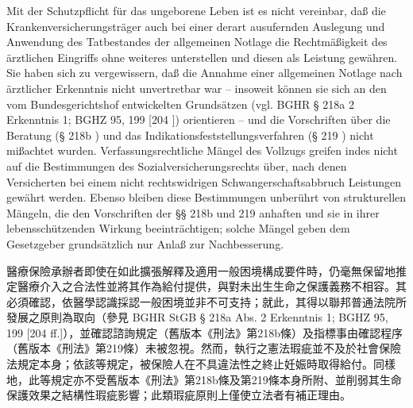 \documentclass[12pt]{article}
\begin{document}
\begin{sourcepara}[title={原文E.232}]
Mit der Schutzpflicht für das ungeborene Leben ist es nicht vereinbar, daß die Krankenversicherungsträger auch bei einer derart ausufernden Auslegung und Anwendung des Tatbestandes der allgemeinen Notlage die Rechtmäßigkeit des ärztlichen Eingriffs ohne weiteres unterstellen und diesen als Leistung gewähren. Sie haben sich zu vergewissern, daß die Annahme einer allgemeinen Notlage nach ärztlicher Erkenntnis nicht unvertretbar war -- insoweit können sie sich an den vom Bundesgerichtshof entwickelten Grundsätzen (vgl. BGHR \abbrStGB{} § 218a \abbrAbs{} 2 Erkenntnis 1; BGHZ 95, 199 [204 \abbrFF{}]) orientieren -- und die Vorschriften über die Beratung (§ 218b \abbrStGB{} \abbrAF{}) und das Indikationsfeststellungsverfahren (§ 219 \abbrStGB{} \abbrAF{}) nicht mißachtet wurden. Verfassungsrechtliche Mängel des Vollzugs greifen indes nicht auf die Bestimmungen des Sozialversicherungsrechts über, nach denen Versicherten bei einem nicht rechtswidrigen Schwangerschaftsabbruch Leistungen gewährt werden. Ebenso bleiben diese Bestimmungen unberührt von strukturellen Mängeln, die den Vorschriften der §§ 218b und 219 \abbrStGB{} \abbrAF{} anhaften und sie in ihrer lebensschützenden Wirkung beeinträchtigen; solche Mängel geben dem Gesetzgeber grundsätzlich nur Anlaß zur Nachbesserung.
\end{sourcepara}
\begin{transpara}
醫療保險承辦者即使在如此擴張解釋及適用一般困境構成要件時，仍毫無保留地推定醫療介入之合法性並將其作為給付提供，與對未出生生命之保護義務不相容。其必須確認，依醫學認識採認一般困境並非不可支持；就此，其得以聯邦普通法院所發展之原則為取向（參見 BGHR StGB § 218a Abs. 2 Erkenntnis 1; BGHZ 95, 199 [204 ff.]），並確認諮詢規定（舊版本《刑法》第218b條）及指標事由確認程序（舊版本《刑法》第219條）未被忽視。然而，執行之憲法瑕疵並不及於社會保險法規定本身；依該等規定，被保險人在不具違法性之終止妊娠時取得給付。同樣地，此等規定亦不受舊版本《刑法》第218b條及第219條本身所附、並削弱其生命保護效果之結構性瑕疵影響；此類瑕疵原則上僅使立法者有補正理由。
\end{transpara}
\end{document}
